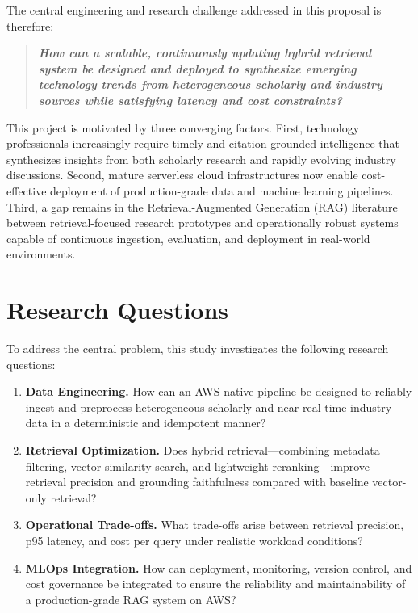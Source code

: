 \documentclass[12pt,a4paper]{report}
\begin{document}
The central engineering and research challenge addressed in this proposal is therefore:

\begin{quote}
\textbf{\textit{How can a scalable, continuously updating hybrid retrieval system be designed and deployed to synthesize emerging technology trends from heterogeneous scholarly and industry sources while satisfying latency and cost constraints?}}
\end{quote}

This project is motivated by three converging factors. First, technology professionals increasingly require timely and citation-grounded intelligence that synthesizes insights from both scholarly research and rapidly evolving industry discussions. Second, mature serverless cloud infrastructures now enable cost-effective deployment of production-grade data and machine learning pipelines. Third, a gap remains in the Retrieval-Augmented Generation (RAG) literature between retrieval-focused research prototypes and operationally robust systems capable of continuous ingestion, evaluation, and deployment in real-world environments.

\section{Research Questions}
\label{sec:rq}

To address the central problem, this study investigates the following research questions:

\begin{enumerate}[leftmargin=0.5in]
  \item \textbf{Data Engineering.} How can an AWS-native pipeline be designed to reliably ingest and preprocess heterogeneous scholarly and near-real-time industry data in a deterministic and idempotent manner?

  \item \textbf{Retrieval Optimization.} Does hybrid retrieval—combining metadata filtering, vector similarity search, and lightweight reranking—improve retrieval precision and grounding faithfulness compared with baseline vector-only retrieval?

  \item \textbf{Operational Trade-offs.} What trade-offs arise between retrieval precision, p95 latency, and cost per query under realistic workload conditions?

  \item \textbf{MLOps Integration.} How can deployment, monitoring, version control, and cost governance be integrated to ensure the reliability and maintainability of a production-grade RAG system on AWS?
\end{enumerate}
\end{document}

